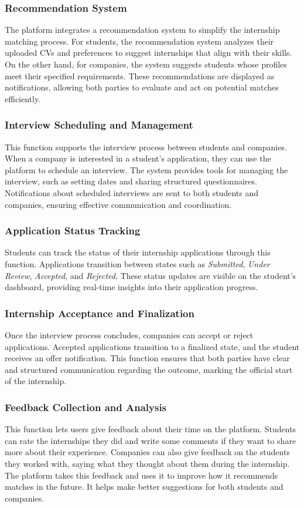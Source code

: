 \documentclass[12pt]{article}
\numberwithin{figure}{section}
\numberwithin{table}{section}
\begin{document}
\subsubsection{Recommendation System}
The platform integrates a recommendation system to simplify the internship matching process. For students, the recommendation system analyzes their uploaded CVs and preferences to suggest internships that align with their skills. On the other hand, for companies, the system suggests students whose profiles meet their specified requirements. These recommendations are displayed as notifications, allowing both parties to evaluate and act on potential matches efficiently.

\subsubsection{Interview Scheduling and Management}
This function supports the interview process between students and companies. When a company is interested in a student’s application, they can use the platform to schedule an interview. The system provides tools for managing the interview, such as setting dates and sharing structured questionnaires. Notifications about scheduled interviews are sent to both students and companies, ensuring effective communication and coordination.

\subsubsection{Application Status Tracking}
Students can track the status of their internship applications through this function. Applications transition between states such as \textit{Submitted}, \textit{Under Review}, \textit{Accepted}, and \textit{Rejected}. These status updates are visible on the student’s dashboard, providing real-time insights into their application progress.

\subsubsection{Internship Acceptance and Finalization}
Once the interview process concludes, companies can accept or reject applications. Accepted applications transition to a finalized state, and the student receives an offer notification. This function ensures that both parties have clear and structured communication regarding the outcome, marking the official start of the internship.

\subsubsection{Feedback Collection and Analysis}
This function lets users give feedback about their time on the platform. Students can rate the internships they did and write some comments if they want to share more about their experience. Companies can also give feedback on the students they worked with, saying what they thought about them during the internship.
The platform takes this feedback and uses it to improve how it recommends matches in the future. It helps make better suggestions for both students and companies.
\end{document}
